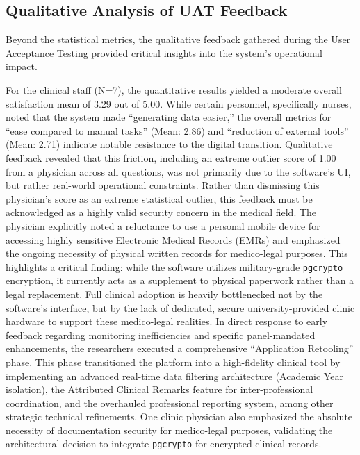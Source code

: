 \subsection{Qualitative Analysis of UAT Feedback}
Beyond the statistical metrics, the qualitative feedback gathered during the User Acceptance Testing provided critical insights into the system's operational impact.

For the clinical staff (N=7), the quantitative results yielded a moderate overall satisfaction mean of 3.29 out of 5.00. While certain personnel, specifically nurses, noted that the system made ``generating data easier,'' the overall metrics for ``ease compared to manual tasks'' (Mean: 2.86) and ``reduction of external tools'' (Mean: 2.71) indicate notable resistance to the digital transition. Qualitative feedback revealed that this friction, including an extreme outlier score of 1.00 from a physician across all questions, was not primarily due to the software's UI, but rather real-world operational constraints. Rather than dismissing this physician's score as an extreme statistical outlier, this feedback must be acknowledged as a highly valid security concern in the medical field. The physician explicitly noted a reluctance to use a personal mobile device for accessing highly sensitive Electronic Medical Records (EMRs) and emphasized the ongoing necessity of physical written records for medico-legal purposes. This highlights a critical finding: while the software utilizes military-grade \texttt{pgcrypto} encryption, it currently acts as a supplement to physical paperwork rather than a legal replacement. Full clinical adoption is heavily bottlenecked not by the software's interface, but by the lack of dedicated, secure university-provided clinic hardware to support these medico-legal realities. In direct response to early feedback regarding monitoring inefficiencies and specific panel-mandated enhancements, the researchers executed a comprehensive ``Application Retooling'' phase. This phase transitioned the platform into a high-fidelity clinical tool by implementing an advanced real-time data filtering architecture (Academic Year isolation), the Attributed Clinical Remarks feature for inter-professional coordination, and the overhauled professional reporting system, among other strategic technical refinements. One clinic physician also emphasized the absolute necessity of documentation security for medico-legal purposes, validating the architectural decision to integrate \texttt{pgcrypto} for encrypted clinical records.

